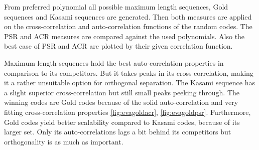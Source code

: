From preferred polynomial all possible maximum length sequences, Gold sequences and Kasami sequences are generated. Then both measures are applied on the cross-correlation and auto-correlation functions of the random codes. The PSR and ACR measures are compared against the used polynomials. Also the best case of PSR and ACR are plotted by their given correlation function.

Maximum length sequences hold the best auto-correlation properties in comparison to its competitors. But it takes peaks in its cross-correlation, making it a rather unsuitable option for orthogonal separation. The Kasami sequence has a slight superior cross-correlation but still small peaks peeking through. The winning codes are Gold codes because of the solid auto-correlation and very fitting cross-correlation properties \ref{fig:evagoldacr}, \ref{fig:evagoldpsr}. Furthermore, Gold codes yield better scalability compared to Kasami codes, because of its larger set. Only its auto-correlations lags a bit behind its competitors but orthogonality is as much as important. 

